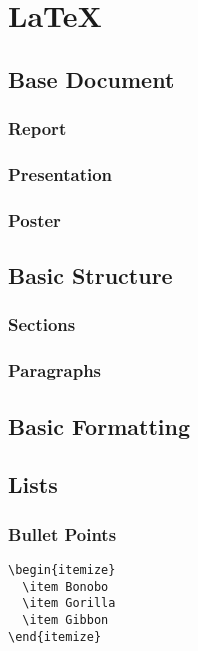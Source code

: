 \chapter{\LaTeX}
\label{latex}

\section{Base Document}

\subsection{Report}
\subsection{Presentation}
\subsection{Poster}

\section{Basic Structure}
\subsection{Sections}
\subsection{Paragraphs}

\section{Basic Formatting}

\section{Lists}
\subsection{Bullet Points}

\begin{verbatim}
\begin{itemize}
  \item Bonobo
  \item Gorilla
  \item Gibbon
\end{itemize}
\end{verbatim}

